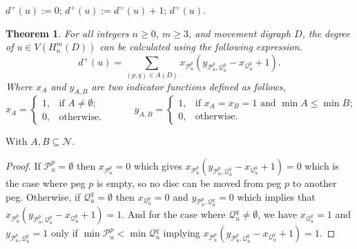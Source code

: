 \documentclass[letterpaper,11pt]{article}
\newtheorem{theorem}{Theorem}
\begin{document}
\begin{algorithm}[H]
		\caption{A function to calculate the outdegree of vertices of $H_{n}^{m}(D)$ }
		\begin{algorithmic}[1]
                \State $d^{+}(u):=0$;
                \State $d^{+}(u):=d^{+}(u)+1$;
                \EndIf
			\EndIf
                \EndFor
                \State \Return $d^{+}(u)$.
			\EndFunction
		\end{algorithmic}
	\end{algorithm}

\begin{theorem}
For all integers $n\geq 0$, $m\geq 3$, and movement digraph $D$, the degree of $u\in V(H_{n}^{m}(D))$ can be calculated using the following expression.
    \begin{equation}
        d^{+}(u)=\sum\limits_{(p,q)\in A(D)} x_{\mathcal{P}_{u}^{p}}(y_{\mathcal{P}_{u}^{p},\mathcal{Q}_{u}^{q}}-x_{\mathcal{Q}_{u}^{q}}+1).
    \end{equation}
    Where $x_{A}$ and $y_{A,B}$ are two indicator functions defined as follows, 
    \begin{equation*}x_{A}=
        \begin{cases}
            1,&\text{if $A\neq \emptyset$};\\
            0,&\text{otherwise.}
        \end{cases}\quad\quad \quad
        y_{A,B}=
        \begin{cases}
            1,&\text{if $x_{A}=x_{B}=1$ and $\min A\leq \min B$};\\
            0,&\text{otherwise.}
        \end{cases}
    \end{equation*}
\end{theorem}
With $A,B\subseteq \mathcal{N}$.
\begin{proof}
If $\mathcal{P}_{u}^{p}=\emptyset$ then $x_{\mathcal{P}_{u}^{p}}=0$ 
 which gives  $x_{\mathcal{P}_{u}^{p}}(y_{\mathcal{P}_{u}^{p},\mathcal{Q}_{u}^{q}}-x_{\mathcal{Q}_{u}^{q}}+1)=0$ which is the case where peg $p$ is empty, so no disc can be moved from peg $p$ to another peg. Otherwise, if $\mathcal{Q}_{u}^{q}=\emptyset$  then $x_{\mathcal{Q}_{u}^{q}}=0$  and $y_{\mathcal{P}_{u}^{p},\mathcal{Q}_{u}^{q}}=0$ which implies that 
    $x_{\mathcal{P}_{u}^{p}}(y_{\mathcal{P}_{u}^{p},\mathcal{Q}_{u}^{q}}-x_{\mathcal{Q}_{u}^{q}}+1)=1$. And for the case where  $\mathcal{Q}_{u}^{q}\neq \emptyset$, we have $x_{\mathcal{Q}_{u}^{q}}=1$ and $y_{\mathcal{P}_{u}^{p},\mathcal{Q}_{u}^{q}}=1$ only if $\min \mathcal{P}_{u}^{p} < \min \mathcal{Q}_{u}^{q} $ implying   $x_{\mathcal{P}_{u}^{p}}(y_{\mathcal{P}_{u}^{p},\mathcal{Q}_{u}^{q}}-x_{\mathcal{Q}_{u}^{q}}+1)=1$.
\end{proof}
\end{document}
